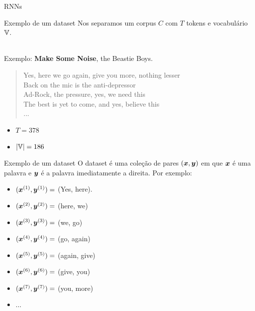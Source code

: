 \documentclass[10pt]{beamer}
\begin{document}
\begin{frame}[fragile]{RNNs}

\end{frame}



\begin{frame}{Exemplo de um dataset}
Nos separamos um corpus $C$ com $T$ tokens e vocabulário $\mathbb{V}$.\\\

Exemplo: \textbf{Make Some Noise}, the Beastie Boys.\\

\begin{quote}
\alert{Yes, here we go again, give you more, nothing lesser\\
Back on the mic is the anti-depressor\\
Ad-Rock, the pressure, yes, we need this\\
The best is yet to come, and yes, believe this\\
... \\}
\end{quote}

\begin{itemize}
\item $T = 378$
\item $|\mathbb{V}| = 186$
\end{itemize}

\end{frame}

\begin{frame}{Exemplo de um dataset}
O dataset é uma coleção de pares $(\bm{x},\bm{y})$ em que $\bm{x}$ é uma palavra e $\bm{y}$ é a palavra imediatamente a direita. Por exemplo:
\begin{itemize}
\item [] $(\bm{x}^{(1)}, \bm{y}^{(1)}) =$ (Yes, here).
\item [] $(\bm{x}^{(2)}, \bm{y}^{(2)}) =$ (here, we)
\item [] $(\bm{x}^{(3)}, \bm{y}^{(3)}) =$ (we, go)
\item [] $(\bm{x}^{(4)}, \bm{y}^{(4)}) =$ (go, again)
\item [] $(\bm{x}^{(5)}, \bm{y}^{(5)}) =$ (again, give)
\item [] $(\bm{x}^{(6)}, \bm{y}^{(6)}) =$ (give, you)
\item [] $(\bm{x}^{(7)}, \bm{y}^{(7)}) =$ (you, more)
\item [] $\dots$
\end{itemize}
\end{frame}
\end{document}
